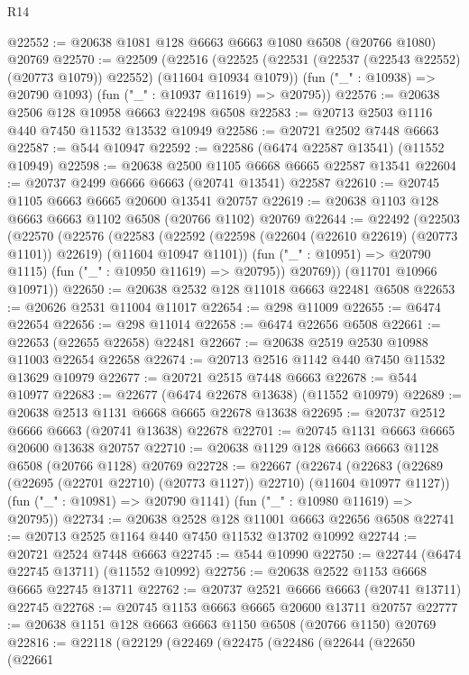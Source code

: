 \begin{lexlean}{R14}
\begin{coremodule}
{{{{{{{{{{{{{{{{{{{{{{{{{{{{{{{{{{{{{{{{{{{{{{{{{{{{{{{{{{{{{{{{{{{{{{{{{{{{{{{{{{@22552 := @20638 @1081 @128 @6663 @6663 @1080 @6508 (@20766 @1080) @20769
@22570 := @22509
    (@22516
      (@22525 (@22531 (@22537 (@22543 @22552) (@20773 @1079)) @22552) (@11604 @10934 @1079))
      (fun ("_" : @10938) => @20790 @1093)
      (fun ("_" : @10937 @11619) => @20795))
@22576 := @20638 @2506 @128 @10958 @6663 @22498 @6508
@22583 := @20713 @2503 @1116 @440 @7450 @11532 @13532 @10949
@22586 := @20721 @2502 @7448 @6663
@22587 := @544 @10947
@22592 := @22586 (@6474 @22587 @13541) (@11552 @10949)
@22598 := @20638 @2500 @1105 @6668 @6665 @22587 @13541
@22604 := @20737 @2499 @6666 @6663 (@20741 @13541) @22587
@22610 := @20745 @1105 @6663 @6665 @20600 @13541 @20757
@22619 := @20638 @1103 @128 @6663 @6663 @1102 @6508 (@20766 @1102) @20769
@22644 := @22492
    (@22503
      (@22570
        (@22576
          (@22583
            (@22592 (@22598 (@22604 (@22610 @22619) (@20773 @1101)) @22619) (@11604 @10947 @1101))
            (fun ("_" : @10951) => @20790 @1115)
            (fun ("_" : @10950 @11619) => @20795))
          @20769))
      (@11701 @10966 @10971))
@22650 := @20638 @2532 @128 @11018 @6663 @22481 @6508
@22653 := @20626 @2531 @11004 @11017
@22654 := @298 @11009
@22655 := @6474 @22654
@22656 := @298 @11014
@22658 := @6474 @22656 @6508
@22661 := @22653 (@22655 @22658) @22481
@22667 := @20638 @2519 @2530 @10988 @11003 @22654 @22658
@22674 := @20713 @2516 @1142 @440 @7450 @11532 @13629 @10979
@22677 := @20721 @2515 @7448 @6663
@22678 := @544 @10977
@22683 := @22677 (@6474 @22678 @13638) (@11552 @10979)
@22689 := @20638 @2513 @1131 @6668 @6665 @22678 @13638
@22695 := @20737 @2512 @6666 @6663 (@20741 @13638) @22678
@22701 := @20745 @1131 @6663 @6665 @20600 @13638 @20757
@22710 := @20638 @1129 @128 @6663 @6663 @1128 @6508 (@20766 @1128) @20769
@22728 := @22667
    (@22674
      (@22683 (@22689 (@22695 (@22701 @22710) (@20773 @1127)) @22710) (@11604 @10977 @1127))
      (fun ("_" : @10981) => @20790 @1141)
      (fun ("_" : @10980 @11619) => @20795))
@22734 := @20638 @2528 @128 @11001 @6663 @22656 @6508
@22741 := @20713 @2525 @1164 @440 @7450 @11532 @13702 @10992
@22744 := @20721 @2524 @7448 @6663
@22745 := @544 @10990
@22750 := @22744 (@6474 @22745 @13711) (@11552 @10992)
@22756 := @20638 @2522 @1153 @6668 @6665 @22745 @13711
@22762 := @20737 @2521 @6666 @6663 (@20741 @13711) @22745
@22768 := @20745 @1153 @6663 @6665 @20600 @13711 @20757
@22777 := @20638 @1151 @128 @6663 @6663 @1150 @6508 (@20766 @1150) @20769
@22816 := @22118
    (@22129
      (@22469
        (@22475
          (@22486
            (@22644
              (@22650
                (@22661
}}}}}}}}}}}}}}}}}}}}}}}}}}}}}}}}}}}}}}}}}}}}}}}}}}}}}}}}}}}}}}}}}}}}}}}}}}}}}}}}}}
\end{coremodule}
\end{lexlean}
